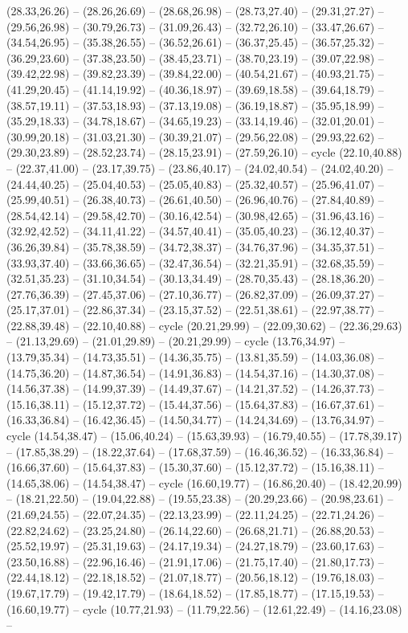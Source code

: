 {(28.33,26.26) -- (28.26,26.69) -- (28.68,26.98) -- (28.73,27.40) -- (29.31,27.27) -- (29.56,26.98) -- (30.79,26.73) -- (31.09,26.43) -- (32.72,26.10) -- (33.47,26.67) -- (34.54,26.95) -- (35.38,26.55) -- (36.52,26.61) -- (36.37,25.45) -- (36.57,25.32) -- (36.29,23.60) -- (37.38,23.50) -- (38.45,23.71) -- (38.70,23.19) -- (39.07,22.98) -- (39.42,22.98) -- (39.82,23.39) -- (39.84,22.00) -- (40.54,21.67) -- (40.93,21.75) -- (41.29,20.45) -- (41.14,19.92) -- (40.36,18.97) -- (39.69,18.58) -- (39.64,18.79) -- (38.57,19.11) -- (37.53,18.93) -- (37.13,19.08) -- (36.19,18.87) -- (35.95,18.99) -- (35.29,18.33) -- (34.78,18.67) -- (34.65,19.23) -- (33.14,19.46) -- (32.01,20.01) -- (30.99,20.18) -- (31.03,21.30) -- (30.39,21.07) -- (29.56,22.08) -- (29.93,22.62) -- (29.30,23.89) -- (28.52,23.74) -- (28.15,23.91) -- (27.59,26.10) -- cycle (22.10,40.88) -- (22.37,41.00) -- (23.17,39.75) -- (23.86,40.17) -- (24.02,40.54) -- (24.02,40.20) -- (24.44,40.25) -- (25.04,40.53) -- (25.05,40.83) -- (25.32,40.57) -- (25.96,41.07) -- (25.99,40.51) -- (26.38,40.73) -- (26.61,40.50) -- (26.96,40.76) -- (27.84,40.89) -- (28.54,42.14) -- (29.58,42.70) -- (30.16,42.54) -- (30.98,42.65) -- (31.96,43.16) -- (32.92,42.52) -- (34.11,41.22) -- (34.57,40.41) -- (35.05,40.23) -- (36.12,40.37) -- (36.26,39.84) -- (35.78,38.59) -- (34.72,38.37) -- (34.76,37.96) -- (34.35,37.51) -- (33.93,37.40) -- (33.66,36.65) -- (32.47,36.54) -- (32.21,35.91) -- (32.68,35.59) -- (32.51,35.23) -- (31.10,34.54) -- (30.13,34.49) -- (28.70,35.43) -- (28.18,36.20) -- (27.76,36.39) -- (27.45,37.06) -- (27.10,36.77) -- (26.82,37.09) -- (26.09,37.27) -- (25.17,37.01) -- (22.86,37.34) -- (23.15,37.52) -- (22.51,38.61) -- (22.97,38.77) -- (22.88,39.48) -- (22.10,40.88) -- cycle (20.21,29.99) -- (22.09,30.62) -- (22.36,29.63) -- (21.13,29.69) -- (21.01,29.89) -- (20.21,29.99) -- cycle (13.76,34.97) -- (13.79,35.34) -- (14.73,35.51) -- (14.36,35.75) -- (13.81,35.59) -- (14.03,36.08) -- (14.75,36.20) -- (14.87,36.54) -- (14.91,36.83) -- (14.54,37.16) -- (14.30,37.08) -- (14.56,37.38) -- (14.99,37.39) -- (14.49,37.67) -- (14.21,37.52) -- (14.26,37.73) -- (15.16,38.11) -- (15.12,37.72) -- (15.44,37.56) -- (15.64,37.83) -- (16.67,37.61) -- (16.33,36.84) -- (16.42,36.45) -- (14.50,34.77) -- (14.24,34.69) -- (13.76,34.97) -- cycle (14.54,38.47) -- (15.06,40.24) -- (15.63,39.93) -- (16.79,40.55) -- (17.78,39.17) -- (17.85,38.29) -- (18.22,37.64) -- (17.68,37.59) -- (16.46,36.52) -- (16.33,36.84) -- (16.66,37.60) -- (15.64,37.83) -- (15.30,37.60) -- (15.12,37.72) -- (15.16,38.11) -- (14.65,38.06) -- (14.54,38.47) -- cycle (16.60,19.77) -- (16.86,20.40) -- (18.42,20.99) -- (18.21,22.50) -- (19.04,22.88) -- (19.55,23.38) -- (20.29,23.66) -- (20.98,23.61) -- (21.69,24.55) -- (22.07,24.35) -- (22.13,23.99) -- (22.11,24.25) -- (22.71,24.26) -- (22.82,24.62) -- (23.25,24.80) -- (26.14,22.60) -- (26.68,21.71) -- (26.88,20.53) -- (25.52,19.97) -- (25.31,19.63) -- (24.17,19.34) -- (24.27,18.79) -- (23.60,17.63) -- (23.50,16.88) -- (22.96,16.46) -- (21.91,17.06) -- (21.75,17.40) -- (21.80,17.73) -- (22.44,18.12) -- (22.18,18.52) -- (21.07,18.77) -- (20.56,18.12) -- (19.76,18.03) -- (19.67,17.79) -- (19.42,17.79) -- (18.64,18.52) -- (17.85,18.77) -- (17.15,19.53) -- (16.60,19.77) -- cycle (10.77,21.93) -- (11.79,22.56) -- (12.61,22.49) -- (14.16,23.08) -- }
